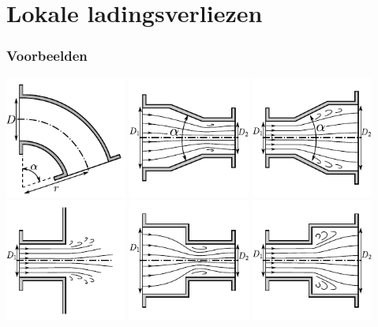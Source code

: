 \documentclass[t]{beamer}
\begin{document}
  	\section{Lokale ladingsverliezen}
  	\begin{frame}
		\frametitle{Voorbeelden}
		\center
		\includegraphics[width=0.3\textwidth]{fig/appendix/Bocht} \quad
		\includegraphics[width=0.3\textwidth]{fig/appendix/Gelijdelijke_vernauwing} \quad
		\includegraphics[width=0.3\textwidth]{fig/appendix/Gelijdelijke_verwijding}
		\\
		\includegraphics[width=0.3\textwidth]{fig/appendix/Uitstroming} \quad
		\includegraphics[width=0.3\textwidth]{fig/appendix/Vernauwing} \quad
		\includegraphics[width=0.3\textwidth]{fig/appendix/Verwijding}
	\end{frame}
\end{document}
